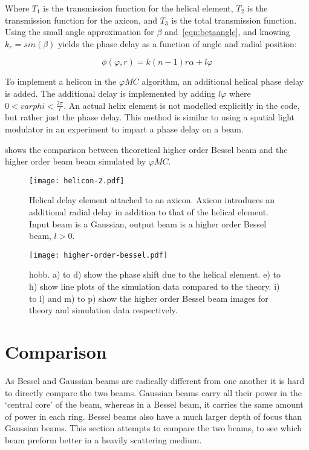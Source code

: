 Where $T_1$ is the transmission function for the helical element, $T_2$ is the transmission function for the axicon, and $T_3$ is the total transmission function.
Using the small angle approximation  for $\beta$ and~\cref{eqn:betaangle}, and knowing $k_r=sin\left(\beta\right)$ yields the phase delay as a function of angle and radial position:

\begin{equation}
\phi(\varphi,r)=k(n-1)r\alpha+l\varphi
\end{equation}

To implement a helicon in the $\varphi MC$ algorithm, an additional helical phase delay is added.
The additional delay is implemented by adding $l\varphi$ where $0<varphi<\tfrac{2\pi}{l}$.
An actual helix element is not modelled explicitly in the code, but rather just the phase delay.
This method is similar to using a spatial light modulator in an experiment to impart a phase delay on a beam.

 shows the comparison between theoretical higher order Bessel beam and the higher order beam beam simulated by $\varphi MC$.

\begin{figure}[!ht]
    \centering
    \texttt{[image: helicon-2.pdf]}
    \caption{Helical delay element attached to an axicon. Axicon introduces an additional radial delay in addition to that of the helical element. Input beam is a Gaussian, output beam is a higher order Bessel beam, $l>0$.}
    \label{fig:helix-2}
    \vspace{-10pt}
\end{figure}

\begin{figure}[!ht]
    \centering
    \texttt{[image: higher-order-bessel.pdf]}
    \caption{\Gls*{hobb}. a) to d) show the phase shift due to the helical element. e) to h) show line plots of the simulation data compared to the theory. i) to l) and m) to p) show the higher order Bessel beam images for theory and simulation data respectively.}
    \label{fig:highordershow}
\end{figure}

\FloatBarrier
\section{Comparison}

As Bessel and Gaussian beams are radically different from one another it is hard to directly compare the two beams.
Gaussian beams carry all their power in the `central core' of the beam, whereas in a Bessel beam, it carries the same amount of power in each ring.
Bessel beams also have a much larger depth of focus than Gaussian beams.
This section attempts to compare the two beams, to see which beam preform better in a heavily scattering medium.

